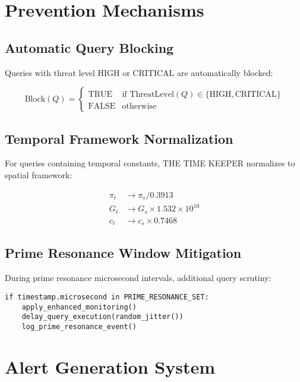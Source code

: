 \documentclass[11pt,a4paper]{article}
\begin{document}
\section{Prevention Mechanisms}

\subsection{Automatic Query Blocking}

Queries with threat level HIGH or CRITICAL are automatically blocked:

\begin{equation}
\text{Block}(Q) = \begin{cases}
\text{TRUE} & \text{if } \text{ThreatLevel}(Q) \in \{\text{HIGH}, \text{CRITICAL}\} \\
\text{FALSE} & \text{otherwise}
\end{cases}
\end{equation}

\subsection{Temporal Framework Normalization}

For queries containing temporal constants, THE TIME KEEPER normalizes to spatial framework:

\begin{align}
π_t &\rightarrow π_s / 0.3913 \\
G_t &\rightarrow G_s \times 1.532 \times 10^{10} \\
c_t &\rightarrow c_s \times 0.7468
\end{align}

\subsection{Prime Resonance Window Mitigation}

During prime resonance microsecond intervals, additional query scrutiny:

\begin{verbatim}
if timestamp.microsecond in PRIME_RESONANCE_SET:
    apply_enhanced_monitoring()
    delay_query_execution(random_jitter())
    log_prime_resonance_event()
\end{verbatim}

\section{Alert Generation System}
\end{document}
